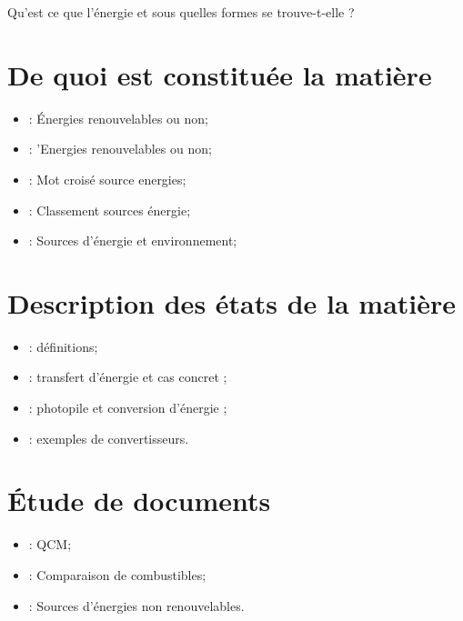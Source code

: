 \documentclass[12pt,a4paper]{article}
\date{}
\title{}
\begin{document}
	
	



\begin{mypb}
	\begin{center}
		{\Large Qu'est ce que l'énergie et sous quelles formes se trouve-t-elle ?}
	\end{center}
\end{mypb}


\section{De quoi est constituée la matière}








\begin{myexos}
	\begin{itemize}
		\item {} : \'Energies renouvelables ou non;
		\item {} : 'Energies renouvelables ou non;
		\item {} : Mot croisé source energies;
		\item {} : Classement sources énergie;
		\item {} : Sources d'énergie et environnement;
	\end{itemize}
\end{myexos}

\section{Description des états de la matière}





\begin{myexos}
	\begin{itemize}
		\item {} : définitions;
		\item {} : transfert d'énergie et cas concret ; 
		\item {} : photopile et conversion d'énergie ;
		\item {} : exemples de convertisseurs.
	\end{itemize}
\end{myexos}

\section{Étude de documents}


\begin{myexos}
	\begin{itemize}
		\item {} : QCM;
		\item {} : Comparaison de combustibles;
		\item {} : Sources d'énergies non renouvelables.
		
	\end{itemize}
\end{myexos}

\appendix

\end{document}
